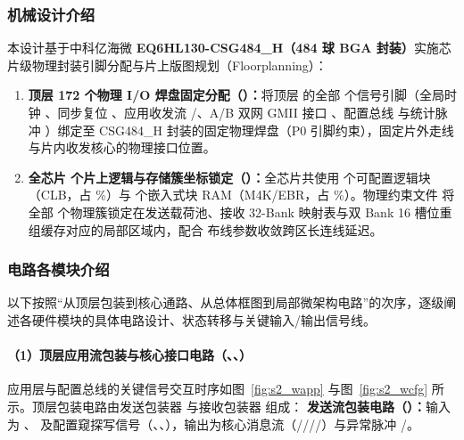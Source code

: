 \subsubsection{机械设计介绍}

本设计基于中科亿海微 \textbf{EQ6HL130-CSG484\_H（484 球 BGA 封装）}实施芯片级物理封装引脚分配与片上版图规划（Floorplanning）：
\begin{enumerate}[leftmargin=2em,itemsep=1pt]
  \item \textbf{顶层 172 个物理 I/O 焊盘固定分配（）：}将顶层  的全部 \Pins{} 个信号引脚（全局时钟 、同步复位 、应用收发流 /、A/B 双网 GMII 接口 、配置总线  与统计脉冲 ）绑定至 CSG484\_H 封装的固定物理焊盘（P0 引脚约束），固定片外走线与片内收发核心的物理接口位置。
  \item \textbf{全芯片 \countsep{\LockedClusters} 个片上逻辑与存储簇坐标锁定（）：}全芯片共使用 \Clb{} 个可配置逻辑块（CLB，占 \ClbPct\%）与 \Mem{} 个嵌入式块 RAM（M4K/EBR，占 \MemPct\%）。物理约束文件  将全部 \countsep{\LockedClusters} 个物理簇锁定在发送载荷池、接收 32-Bank 映射表与双 Bank 16 槽位重组缓存对应的局部区域内，配合  布线参数收敛跨区长连线延迟。
\end{enumerate}

\subsubsection{电路各模块介绍}

以下按照“从顶层包装到核心通路、从总体框图到局部微架构电路”的次序，逐级阐述各硬件模块的具体电路设计、状态转移与关键输入/输出信号线。

\paragraph{（1）顶层应用流包装与核心接口电路（、、）}

应用层与配置总线的关键信号交互时序如图~\ref{fig:s2_wapp} 与图~\ref{fig:s2_wcfg} 所示。顶层包装电路由发送包装器  与接收包装器  组成：
\textbf{发送流包装电路（）：}输入为 、 及配置窥探写信号（、、），输出为核心消息流（////）与异常脉冲 /。

